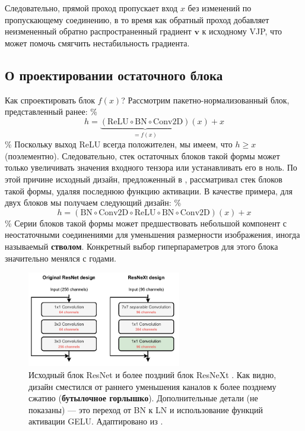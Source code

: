 \vspace{2em}
Следовательно, прямой проход пропускает вход $x$ без изменений по пропускающему соединению, в то время как обратный проход добавляет неизмененный обратно распространенный градиент $\mathbf{v}$ к исходному VJP, что может помочь смягчить нестабильность градиента.

\subsection*{О проектировании остаточного блока}

Как спроектировать блок $f(x)$? Рассмотрим пакетно-нормализованный блок, представленный ранее:
\%
$$
h = \underbrace{(\text{ReLU}\circ \text{BN} \circ \text{Conv2D})}_{=f(x)}(x) + x
$$
\%
Поскольку выход ReLU всегда положителен, мы имеем, что $h \ge x$ (поэлементно). Следовательно, стек остаточных блоков такой формы может только увеличивать значения входного тензора или устанавливать его в ноль. По этой причине исходный дизайн, предложенный в \cite{he2016deep}, рассматривал стек блоков такой формы, удаляя последнюю функцию активации. В качестве примера, для двух блоков мы получаем следующий дизайн:
\%
$$
h = (\text{BN} \circ \text{Conv2D} \circ\text{ReLU}\circ \text{BN} \circ \text{Conv2D})(x) + x
$$
\%
Серии блоков такой формы может предшествовать небольшой компонент с неостаточными соединениями для уменьшения размерности изображения, иногда называемый \textbf{стволом}. Конкретный выбор гиперпараметров для этого блока значительно менялся с годами.

\begin{figure}
    \centering
    \hspace{1em}\includegraphics[width=0.6\textwidth]{images/resnet_design}
    \caption{Исходный блок ResNet \cite{he2016deep} и более поздний блок ResNeXt \cite{liu2022convnet}. Как видно, дизайн сместился от раннего уменьшения каналов к более позднему сжатию (\textbf{бутылочное горлышко}). Дополнительные детали (не показаны) — это переход от BN к LN и использование функций активации GELU. Адаптировано из \cite{liu2022convnet}.}
    \label{fig:resnext}
\end{figure}

